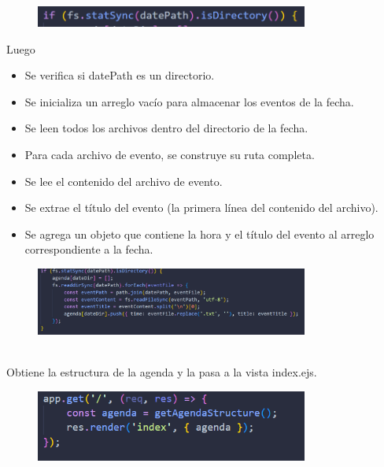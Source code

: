 \documentclass{article}
\begin{document}
     \begin{figure}[H]
		          \centering
		          \includegraphics[width=0.8\textwidth,keepaspectratio]                       {img/ifAg.png}
    \end{figure}
Luego
\begin{itemize}
    \item Se verifica si datePath es un directorio.
    \item Se inicializa un arreglo vacío para almacenar los eventos de la fecha.
    \item Se leen todos los archivos dentro del directorio de la fecha.
    \item Para cada archivo de evento, se construye su ruta completa.
    \item Se lee el contenido del archivo de evento.
    \item Se extrae el título del evento (la primera línea del contenido del archivo).
    \item Se agrega un objeto que contiene la hora y el título del evento al arreglo correspondiente a la fecha.
\end{itemize}

    \begin{figure}[H]
		          \centering
		          \includegraphics[width=0.8\textwidth,keepaspectratio]                       {img/ifCon.png}
    \end{figure}
    
\\Obtiene la estructura de la agenda y la pasa a la vista index.ejs.

    \begin{figure}[H]
		          \centering
		          \includegraphics[width=0.8\textwidth,keepaspectratio]                       {img/home.png}
    \end{figure}
\end{document}

